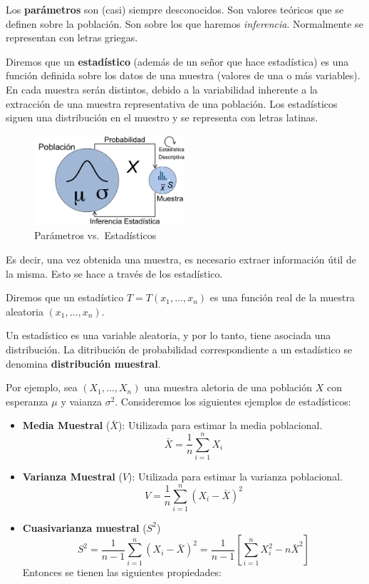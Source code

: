 \documentclass[
  letterpaper,
  DIV=11,
  numbers=noendperiod]{scrreprt}
\providecommand{\tightlist}{%
  \setlength{\itemsep}{0pt}\setlength{\parskip}{0pt}}\usepackage{longtable,booktabs,array}
\begin{document}
Los \textbf{parámetros} son (casi) siempre desconocidos. Son valores
teóricos que se definen sobre la población. Son sobre los que haremos
\emph{inferencia}. Normalmente se representan con letras griegas.

Diremos que un \textbf{estadístico} (además de un señor que hace
estadística) es una función definida sobre los datos de una muestra
(valores de una o más variables). En cada muestra serán distintos,
debido a la variabilidad inherente a la extracción de una muestra
representativa de una población. Los estadísticos siguen una
distribución en el muestro y se representa con letras latinas.

\begin{figure}

{\centering \includegraphics[width=0.5\textwidth,height=\textheight]{dogma2.png}

}

\caption{\label{fig-muestreo2}Parámetros vs.~Estadísticos}

\end{figure}

Es decir, una vez obtenida una muestra, es necesario extraer información
útil de la misma. Esto se hace a través de los estadístico.

Diremos que un estadístico \(T= T(x_1,\ldots,x_n)\) es una función real
de la muestra aleatoria \((x_1,\ldots,x_n)\).

Un estadístico es una variable aleatoria, y por lo tanto, tiene asociada
una distribución. La ditribución de probabilidad correspondiente a un
estadístico se denomina \textbf{distribución muestral}.

Por ejemplo, sea \((X_1,\ldots,X_n)\) una muestra aletoria de una
población \(X\) con esperanza \(\mu\) y vaianza \(\sigma^2\).
Consideremos los siguientes ejemplos de estadísticos:

\begin{itemize}
\tightlist
\item
  \textbf{Media Muestral} (\(\bar{X}\)): Utilizada para estimar la media
  poblacional. \[
  \bar{X}=\frac{1}{n}\sum_{i=1}^nX_i
  \]
\item
  \textbf{Varianza Muestral} (\(V\)): Utilizada para estimar la varianza
  poblacional. \[
  V=\frac{1}{n}\sum_{i=1}^n(X_i-\bar{X})^2
  \]
\item
  \textbf{Cuasivarianza muestral} (\(S^2\)) \[
  S^2=\frac{1}{n-1}\sum_{i=1}^n(X_i-\bar{X})^2=\frac{1}{n-1}\left [ \sum_{i=1}^nX_i^2-n\bar{X}^2\right]
  \] Entonces se tienen las siguientes propiedades:
\end{itemize}
\end{document}

